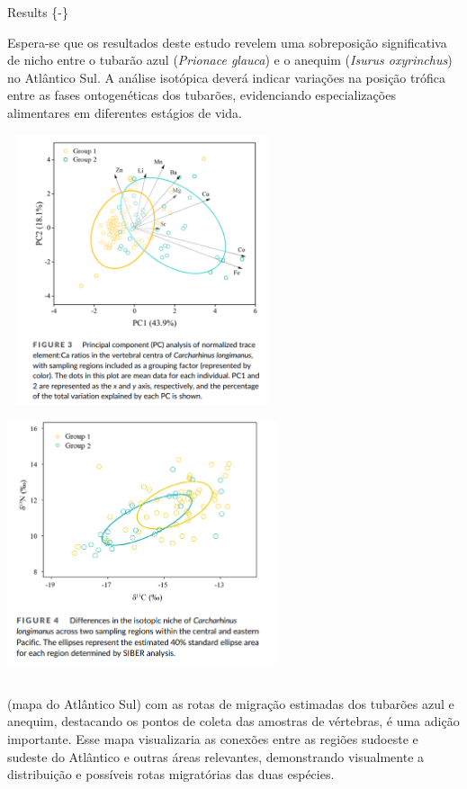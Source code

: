 \documentclass[utf8]{FrontiersinHarvard}
\begin{document}
Results \{-\}

Espera-se que os resultados deste estudo revelem uma sobreposição
significativa de nicho entre o tubarão azul (\emph{Prionace glauca}) e o
anequim (\emph{Isurus oxyrinchus}) no Atlântico Sul. A análise isotópica
deverá indicar variações na posição trófica entre as fases ontogenéticas
dos tubarões, evidenciando especializações alimentares em diferentes
estágios de vida.

\includegraphics[width=3.125in,height=3.125in]{grupo2.png}
\includegraphics[width=3.125in,height=3.125in]{group22.png}

(mapa do Atlântico Sul) com as rotas de migração estimadas dos tubarões
azul e anequim, destacando os pontos de coleta das amostras de
vértebras, é uma adição importante. Esse mapa visualizaria as conexões
entre as regiões sudoeste e sudeste do Atlântico e outras áreas
relevantes, demonstrando visualmente a distribuição e possíveis rotas
migratórias das duas espécies.
\end{document}

